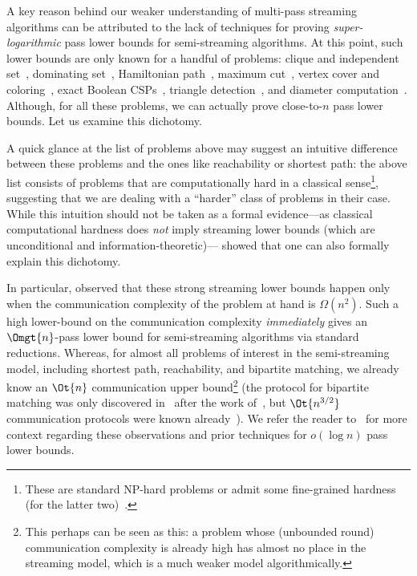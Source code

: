 A key reason behind our  weaker understanding of multi-pass streaming algorithms can be attributed to the lack of techniques for 
proving  \emph{super-logarithmic} pass lower bounds for semi-streaming algorithms. At this point, such lower bounds
are only known for a handful of problems: clique and independent set~\cite{HalldorssonSSW12}, dominating set~\cite{Assadi17sc}, Hamiltonian path~\cite{BachrachCDELP19}, maximum cut~\cite{BachrachCDELP19,KolPSY23}, vertex cover and coloring~\cite{AbboudCKP21}, exact Boolean CSPs~\cite{KolPSY23}, triangle detection~\cite{PapadimitriouS84,Bar-YossefKS02}, and diameter computation~\cite{FrischknechtHW12}. Although, for all these problems, we can 
actually prove  close-to-$n$ pass lower bounds. Let us examine this dichotomy. 

A quick glance at the list of problems above may suggest an intuitive difference between these problems and the ones like reachability or shortest path: the above list consists of problems 
that are computationally hard in a classical sense\footnote{These are  standard NP-hard problems or admit some fine-grained hardness (for the latter two)~\cite{RodittyW13,KopelowitzPP16}.}, 
suggesting that we are dealing with a ``harder'' class of problems in their case. While this intuition should not be taken as a formal evidence---as classical computational hardness does \emph{not} imply 
streaming lower bounds (which are unconditional and information-theoretic)---\cite{AssadiCK19} showed that one can also formally explain this dichotomy.

In particular, \cite{AssadiCK19} observed that these strong streaming lower bounds happen only when the communication complexity of the problem at hand
 is $\Omega(n^2)$. Such a high lower-bound on the communication complexity \textit{immediately} gives an $\Omgt{n}$-pass lower bound for semi-streaming algorithms via standard reductions. Whereas, for almost all problems of interest in the semi-streaming model, including shortest path, reachability, and bipartite matching, 
we already know an $\Ot{n}$ communication upper bound\footnote{This perhaps can be seen as this: a problem whose (unbounded round) communication complexity is already high has almost no place in the streaming
model, which is a much weaker model algorithmically.} (the protocol for bipartite matching was only discovered in~\cite{blikstadBEMN22} after the work of~\cite{AssadiCK19}, but $\Ot{n^{3/2}}$ communication protocols were known already~\cite{IvanyosKLSW12,DobzinskiNO19}). We refer the reader to~\cite[Section 1.1]{AssadiCK19} for more context regarding these observations and prior techniques for $o(\log{n})$ pass lower bounds. 

